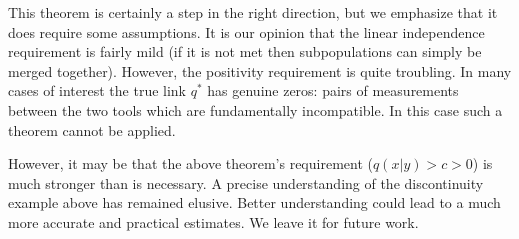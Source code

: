 This theorem is certainly a step in the right direction, but we emphasize that it does require some assumptions.  It is our opinion that the linear independence requirement is fairly mild (if it is not met then subpopulations can simply be merged together).  However, the positivity requirement is quite troubling.  In many cases of interest the true link $q^*$ has genuine zeros: pairs of measurements between the two tools which are fundamentally incompatible.  In this case such a theorem cannot be applied.  

However, it may be that the above theorem's requirement ($q(x|y)>c>0$) is much stronger than is necessary.  A precise understanding of the discontinuity example above has remained elusive.  Better understanding could lead to a much more accurate and practical estimates.  We leave it for future work.







































